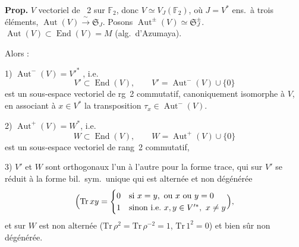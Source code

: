 \documentclass[11pt,a4paper]{article}
\begin{document}
\textbf{Prop.} $V$ vectoriel de ~2 sur $\mathbb{F}_2$, donc
$V \simeq V_J(\mathbb{F}_2)$, où $J = V^*$ ens.\ à trois éléments,
$\operatorname{Aut}(V) \xrightarrow{\;\sim\;} \mathfrak{S}_J$. Posons
$\operatorname{Aut}^{\pm}(V) \simeq \mathfrak{S}_J^{\pm}$.
 $\operatorname{Aut}(V) \subset \operatorname{End}(V) = M$
\struck{\ill{}} (alg.\ d'Azumaya).

Alors :

1) $\operatorname{Aut}^-(V) = V'^{*}$ \struck{\ill{}}, i.e.
\[
  V' \subset \operatorname{End}(V), \qquad
  V' = \operatorname{Aut}^-(V) \cup \{0\}
\]
est un sous-espace vectoriel de rg~2 commutatif, canoniquement isomorphe à $V$,
en associant à $x \in V^*$ la transposition $\tau_x \in \operatorname{Aut}^-(V)$.

2) $\operatorname{Aut}^+(V) = W^*$, i.e.
\[
  W \subset \operatorname{End}(V), \qquad
  W = \operatorname{Aut}^+(V) \cup \{0\}
\]
est un sous-espace vectoriel de rang~2 commutatif,

3) $V'$ et $W$ sont orthogonaux l'un à l'autre pour la forme trace, qui sur
$V'$ se réduit à la forme bil.\ sym.\ unique qui est alternée et non dégénérée
\[
  \Bigl(\mathrm{Tr}\, xy =
  \begin{cases}
    0 & \text{si } x = y, \text{ ou } x \text{ ou } y = 0\\
    1 & \text{sinon i.e.\ } x, y \in V'^{*},\ x \neq y
  \end{cases}\Bigr),
\]
et sur $W$ est non alternée ($\mathrm{Tr}\,\rho^2 = \mathrm{Tr}\,\rho^{-2} = 1$,
$\mathrm{Tr}\,1^2 = 0$) et bien sûr non dégénérée.
\end{document}
